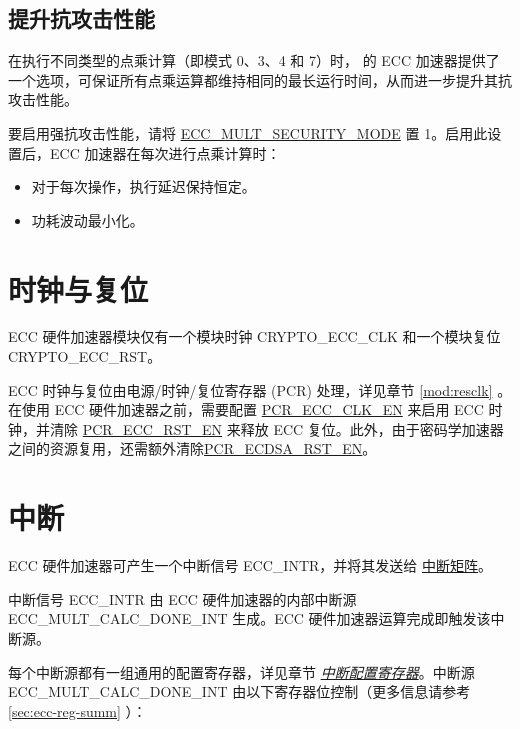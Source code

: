 \documentclass[main\_\_CN.tex]{subfiles}
\begin{document}
\subsection{提升抗攻击性能}
\label{sec:ecc-anti-attack}

在执行不同类型的点乘计算（即模式 0、3、4 和 7）时，\chipname{} 的 ECC 加速器提供了一个选项，可保证所有点乘运算都维持相同的最长运行时间，从而进一步提升其抗攻击性能。

要启用强抗攻击性能，请将 \hyperref[fielddesc:ECCMULTSECURITYMODE]{ECC\_MULT\_SECURITY\_MODE} 置 1。启用此设置后，ECC 加速器在每次进行点乘计算时：

\begin{itemize}
    \item 对于每次操作，执行延迟保持恒定。
    \item 功耗波动最小化。
\end{itemize}


\section{时钟与复位}
\label{sec:ecc-clkrst}

\chipname{} ECC 硬件加速器模块仅有一个模块时钟 CRYPTO\_ECC\_CLK 和一个模块复位 CRYPTO\_ECC\_RST。

ECC 时钟与复位由电源/时钟/复位寄存器 (PCR) 处理，详见章节 \ref{mod:resclk} \textit{}。在使用 ECC 硬件加速器之前，需要配置 \hyperref[fielddesc:PCRECCCLKEN]{PCR\_ECC\_CLK\_EN} 来启用 ECC 时钟，并清除 \hyperref[fielddesc:PCRECCRSTEN]{PCR\_ECC\_RST\_EN} 来释放 ECC 复位。此外，由于密码学加速器之间的资源复用，还需额外清除\hyperref[fielddesc:PCRECDSARSTEN]{PCR\_ECDSA\_RST\_EN}。


\section{中断}
\label{sec:ecc-interrupt}

\chipname{} ECC 硬件加速器可产生一个中断信号 ECC\_INTR，并将其发送给 \hyperref[mod:intmtrx]{中断矩阵}。

中断信号 ECC\_INTR 由 ECC 硬件加速器的内部中断源 \label{int:ECCMULTCALCDONEINT}{ECC\_MULT\_CALC\_DONE\_INT} 生成。ECC 硬件加速器运算完成即触发该中断源。

每个中断源都有一组通用的配置寄存器，详见章节 \hyperref[interrupt-config-registers]{\textit{中断配置寄存器}}。中断源 ECC\_MULT\_CALC\_DONE\_INT 由以下寄存器位控制（更多信息请参考 \ref{sec:ecc-reg-summ} \textit{}）：
\end{document}
